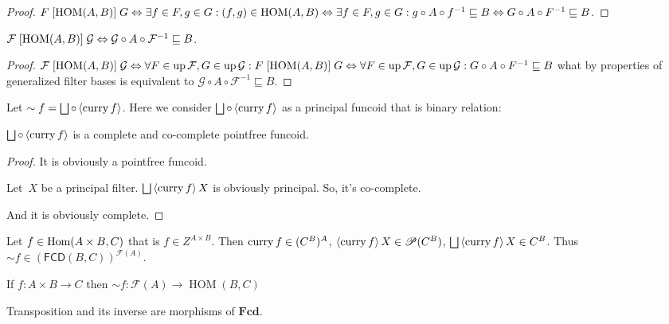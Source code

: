 \begin{proof}
$F\mathrel{\left[\operatorname{HOM}(A,B)\right]}G \Leftrightarrow
\exists f\in F,g\in G:(f,g)\in\operatorname{HOM}(A,B)\Leftrightarrow
\exists f\in F,g\in G:g\circ A\circ f^{-1}\sqsubseteq B\Leftrightarrow
G\circ A\circ F^{-1}\sqsubseteq B$.
\end{proof}

\begin{prop}
$\mathcal{F}\mathrel{\left[\operatorname{HOM}(A,B)\right]}\mathcal{G} \Leftrightarrow \mathcal{G}\circ A\circ \mathcal{F}^{-1}\sqsubseteq B$.
\end{prop}

\begin{proof}
$\mathcal{F}\mathrel{\left[\operatorname{HOM}(A,B)\right]}\mathcal{G} \Leftrightarrow
\forall F\in\operatorname{up}\mathcal{F},G\in\operatorname{up}\mathcal{G}:F\mathrel{\left[\operatorname{HOM}(A,B)\right]}G
\Leftrightarrow
\forall F\in\operatorname{up}\mathcal{F},G\in\operatorname{up}\mathcal{G}:G\circ A\circ F^{-1}\sqsubseteq B$ what by properties of generalized filter
bases is equivalent to $\mathcal{G}\circ A\circ \mathcal{F}^{-1}\sqsubseteq B$.
\end{proof}

Let $\sim f=\bigsqcup\circ\supfun{\curry f}$. Here we consider $\bigsqcup\circ\supfun{\curry f}$ as a principal funcoid that is binary relation:

\begin{prop}
$\bigsqcup\circ\supfun{\curry f}$ is a complete and co-complete pointfree funcoid.
\end{prop}

\begin{proof}
It is obviously a pointfree funcoid.

Let~$X$ be a principal filter.
$\bigsqcup\supfun{\curry f}X$ is obviously principal.
So, it's co-complete.

And it is obviously complete.
\end{proof}

Let $f\in\operatorname{Hom}(A\times B,C)$ that is $f\in Z^{A\times B}$. Then
$\operatorname{curry} f\in (C^B)^A$, $\left\langle \operatorname{curry} f\right\rangle X\in\mathscr{P}(C^B)$,
$\bigsqcup\supfun{\curry f}X\in C^B$.
Thus $\sim f\in (\mathsf{FCD}(B,C))^{\mathscr{F}(A)}$.

If $f : A \times B \rightarrow C$ then $\sim f : \mathscr{F}(A) \rightarrow \operatorname{HOM} ( B , C)$


\begin{prop}
Transposition and its inverse are morphisms of $\mathbf{Fcd}$.
\end{prop}

